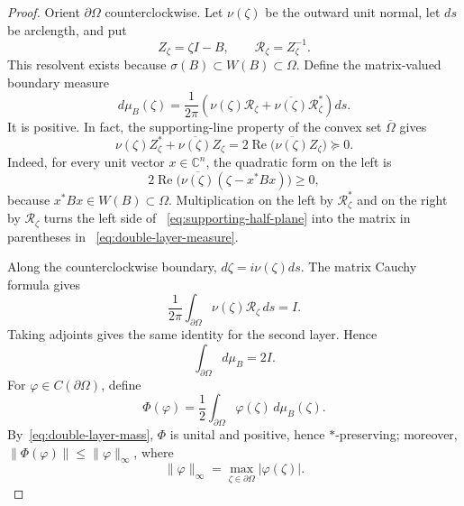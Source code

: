 \documentclass[preprints,article,submit,oneauthor]{Definitions/mdpi}
\theoremstyle{mdpi}
\theoremstyle{definition}
\newcommand{\C}{\mathbb C}
\newcommand{\RePart}{\operatorname{Re}}
\begin{document}
\begin{proof}
Orient $\partial\Omega$ counterclockwise.  Let $\nu(\zeta)$ be the
outward unit normal, let $ds$ be arclength, and put
\[
  Z_\zeta=\zeta I-B,
  \qquad
  \mathcal R_\zeta=Z_\zeta^{-1}.
\]
This resolvent exists because
$\sigma(B)\subset W(B)\subset\Omega$.  Define the matrix-valued
boundary measure
\begin{equation}
  d\mu_B(\zeta)=\frac{1}{2\pi}
  \left(
    \nu(\zeta)\mathcal R_\zeta+
    \overline{\nu(\zeta)}\mathcal R_\zeta^*
  \right)ds.
  \label{eq:double-layer-measure}
\end{equation}
It is positive.  In fact, the supporting-line property of the convex
set $\overline\Omega$ gives
\begin{equation}
  \nu(\zeta)Z_\zeta^*+\overline{\nu(\zeta)}Z_\zeta
  =2\RePart\bigl(\overline{\nu(\zeta)}Z_\zeta\bigr)\succeq0.
  \label{eq:supporting-half-plane}
\end{equation}
Indeed, for every unit vector $x\in\C^n$, the quadratic form on the
left is
\[
  2\RePart\bigl(\overline{\nu(\zeta)}
  (\zeta-x^*Bx)\bigr)\geq0,
\]
because $x^*Bx\in W(B)\subset\Omega$.
Multiplication on the left by $\mathcal R_\zeta^*$ and on the right by
$\mathcal R_\zeta$ turns the left side of~%
\eqref{eq:supporting-half-plane} into the matrix in parentheses in~%
\eqref{eq:double-layer-measure}.

Along the counterclockwise boundary,
$d\zeta=i\nu(\zeta)ds$.  The matrix Cauchy formula gives
\begin{equation}
  \frac{1}{2\pi}\int_{\partial\Omega}
  \nu(\zeta)\mathcal R_\zeta\,ds=I.
  \label{eq:first-layer-mass}
\end{equation}
Taking adjoints gives the same identity for the second layer.  Hence
\begin{equation}
  \int_{\partial\Omega}d\mu_B=2I.
  \label{eq:double-layer-mass}
\end{equation}
For $\varphi\in C(\partial\Omega)$, define
\begin{equation}
  \Phi(\varphi)=\frac12
  \int_{\partial\Omega}\varphi(\zeta)\,d\mu_B(\zeta).
  \label{eq:Phi-definition}
\end{equation}
By~\eqref{eq:double-layer-mass}, $\Phi$ is unital and positive, hence
$*$-preserving; moreover,
$\lVert\Phi(\varphi)\rVert\leq\lVert\varphi\rVert_\infty$, where
\[
  \lVert\varphi\rVert_\infty
  =\max_{\zeta\in\partial\Omega}\lvert\varphi(\zeta)\rvert.
\]


\end{proof}
\end{document}
